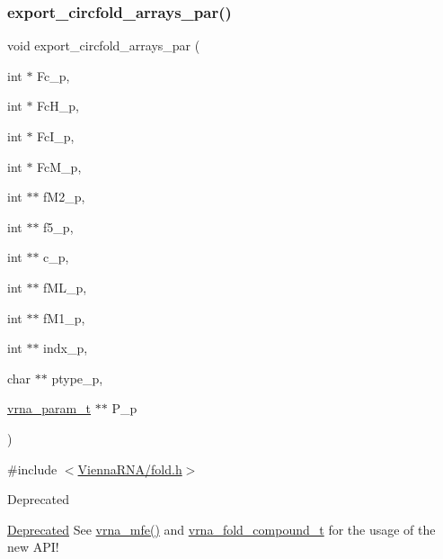 \subsubsection{\texorpdfstring{export\+\_\+circfold\+\_\+arrays\+\_\+par()}{export\_circfold\_arrays\_par()}}
{\footnotesize\ttfamily void export\+\_\+circfold\+\_\+arrays\+\_\+par (\begin{DoxyParamCaption}\item[{int $\ast$}]{Fc\+\_\+p,  }\item[{int $\ast$}]{Fc\+H\+\_\+p,  }\item[{int $\ast$}]{Fc\+I\+\_\+p,  }\item[{int $\ast$}]{Fc\+M\+\_\+p,  }\item[{int $\ast$$\ast$}]{f\+M2\+\_\+p,  }\item[{int $\ast$$\ast$}]{f5\+\_\+p,  }\item[{int $\ast$$\ast$}]{c\+\_\+p,  }\item[{int $\ast$$\ast$}]{f\+M\+L\+\_\+p,  }\item[{int $\ast$$\ast$}]{f\+M1\+\_\+p,  }\item[{int $\ast$$\ast$}]{indx\+\_\+p,  }\item[{char $\ast$$\ast$}]{ptype\+\_\+p,  }\item[{\hyperlink{group__energy__parameters_ga8a69ca7d787e4fd6079914f5343a1f35}{vrna\+\_\+param\+\_\+t} $\ast$$\ast$}]{P\+\_\+p }\end{DoxyParamCaption})}



{\ttfamily \#include $<$\hyperlink{fold_8h}{Vienna\+R\+N\+A/fold.\+h}$>$}

\begin{DoxyRefDesc}{Deprecated}
\item[\hyperlink{deprecated__deprecated000079}{Deprecated}]See \hyperlink{group__mfe__fold_gabd3b147371ccf25c577f88bbbaf159fd}{vrna\+\_\+mfe()} and \hyperlink{group__fold__compound_ga1b0cef17fd40466cef5968eaeeff6166}{vrna\+\_\+fold\+\_\+compound\+\_\+t} for the usage of the new A\+P\+I!\end{DoxyRefDesc}
\mbox{\label{group__mfe__fold__single_ga2163034a25c6115d894b199e97e03f6c}} 
